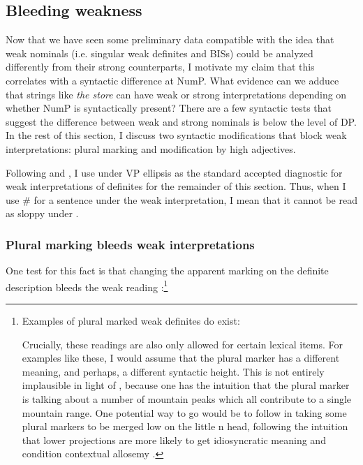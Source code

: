 \documentclass[output=paper,
modfonts
]{langscibook}
\begin{document}
\subsection{Bleeding weakness}

Now that we have seen some preliminary data compatible with the idea that weak nominals (i.e. singular weak definites and BISs) could be analyzed differently from their strong counterparts, I motivate my claim that this correlates with a syntactic difference  at NumP. What evidence can we adduce that strings like \textit{the store} can have weak or strong interpretations depending on whether NumP is syntactically present? There are a few syntactic tests that suggest the difference between weak and strong nominals is below the level of DP. In the rest of this section, I discuss two syntactic modifications that block weak interpretations: plural marking and modification by high adjectives.

Following \citet{CarlsonSussman2005} and \citet{Aguilar-Guevara2014}, I use  under VP ellipsis as the standard accepted diagnostic for weak interpretations of definites for the remainder of this section. Thus, when I use \# for a sentence under the weak interpretation, I mean that it cannot be read as sloppy under .

\subsubsection{Plural marking bleeds weak interpretations}

One test for this fact is that changing the apparent  marking on the definite description bleeds the weak reading \citep[19]{Aguilar-Guevara2014}:\footnote{Examples of plural marked weak definites do exist:
\begin{exe}
 \end{exe}
Crucially, these readings are also only allowed for certain lexical items. For examples like these, I would assume that the plural marker has a different meaning, and perhaps, a different syntactic height. This is not entirely implausible in light of , because one has the intuition that the plural marker is talking about a number of mountain peaks which all contribute to a single mountain range. One potential way to go would be to follow \citep{Kramer2015} in taking some plural markers to be merged low on the little n head, following the intuition that lower projections are more likely to get idiosyncratic meaning and condition contextual allosemy \citep{romanova2005,svenonius2005,marantz2013}.}
\end{document}
